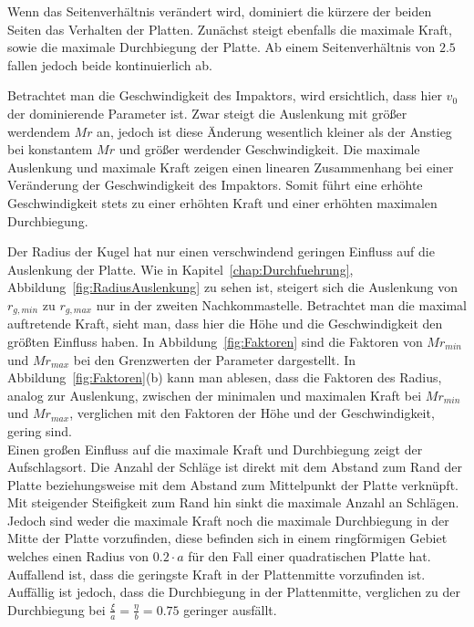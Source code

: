 Wenn das Seitenverhältnis verändert wird, dominiert die kürzere der beiden Seiten das Verhalten der Platten. Zunächst steigt ebenfalls die maximale Kraft, sowie die maximale Durchbiegung der Platte. Ab einem Seitenverhältnis von $2.5$ fallen jedoch beide kontinuierlich ab.

Betrachtet man die Geschwindigkeit des Impaktors, wird ersichtlich, dass hier $v_{0}$ der dominierende Parameter ist. Zwar steigt die Auslenkung mit größer werdendem $Mr$ an, jedoch ist diese Änderung wesentlich kleiner als der Anstieg bei konstantem $Mr$ und größer werdender Geschwindigkeit. Die maximale Auslenkung und maximale Kraft zeigen einen linearen Zusammenhang bei einer Veränderung der Geschwindigkeit des Impaktors. Somit führt eine erhöhte Geschwindigkeit stets zu einer erhöhten Kraft und einer erhöhten maximalen Durchbiegung.

Der Radius der Kugel hat nur einen verschwindend geringen Einfluss auf die Auslenkung der Platte. Wie in Kapitel~\ref{chap:Durchfuehrung}, Abbildung~\ref{fig:RadiusAuslenkung} zu sehen ist, steigert sich die Auslenkung von $r_{g,min}$ zu $r_{g,max}$ nur in der zweiten Nachkommastelle.
Betrachtet man die maximal auftretende Kraft, sieht man, dass hier die Höhe und die Geschwindigkeit den größten Einfluss haben. In Abbildung~\ref{fig:Faktoren} sind die Faktoren von $Mr_{min}$ und $Mr_{max}$ bei den Grenzwerten der Parameter dargestellt. In Abbildung~\ref{fig:Faktoren}(b) kann man ablesen, dass die Faktoren des Radius, analog zur Auslenkung, zwischen der minimalen und maximalen Kraft bei $Mr_{min}$ und $Mr_{max}$, verglichen mit den Faktoren der Höhe und der Geschwindigkeit, gering sind. \\

Einen großen Einfluss auf die maximale Kraft und Durchbiegung zeigt der Aufschlagsort.
Die Anzahl der Schläge ist direkt mit dem Abstand zum Rand der Platte beziehungsweise mit dem Abstand zum Mittelpunkt der Platte verknüpft. Mit steigender Steifigkeit zum Rand hin sinkt die maximale Anzahl an Schlägen. Jedoch sind weder die maximale Kraft noch die maximale Durchbiegung in der Mitte der Platte vorzufinden, diese befinden sich in einem ringförmigen Gebiet welches einen Radius von $0.2 \cdot a$ für den Fall einer quadratischen Platte hat. Auffallend ist, dass die geringste Kraft in der Plattenmitte vorzufinden ist. Auffällig ist jedoch, dass die Durchbiegung in der Plattenmitte, verglichen zu der Durchbiegung bei $\frac{\xi}{a} = \frac{\eta}{b}= 0.75$ geringer ausfällt.


